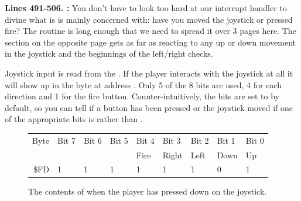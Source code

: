 \textbf{Lines 491-506. :}  You don't have to look too hard at our interrupt handler
to divine what is is mainly concerned with: have you moved the joystick or pressed fire? The routine is long enough
that we need to spread it over 3 pages here. The section on the opposite page gets as far as reacting to any up or
down movement in the joystick and the beginnings of the left/right checks. 

Joystick input is read from the . If the player interacts with the joystick at all it will
show up in the byte at address . Only 5 of the 8 bits are used, 4 for each direction and 1 for the fire button.
Counter-intuitively, the bits are set to  by default, so you can tell if a button has been pressed or the joystick moved
if one of the appropriate bits is  rather than .

\begin{figure}[H]
  {
    \setlength{\tabcolsep}{3.0pt}
    \setlength\cmidrulewidth{\heavyrulewidth} %
    \begin{adjustbox}{width=5cm,center}

      \begin{tabular}{rllllllll}
        \toprule
        Byte & Bit 7 & Bit 6 & Bit 5 & Bit 4 & Bit 3 & Bit 2 & Bit 1 & Bit 0        \\
             &       &       &       & Fire  & Right & Left  & Down  & Up           \\
        \midrule
        \$FD & 1 & 1 & 1 & 1 & 1 & 1 & 0 & 1 \\
        \bottomrule
      \end{tabular}
    \end{adjustbox}
  }\caption*{The contents of  when the player has pressed down on the joystick.}
\end{figure}

